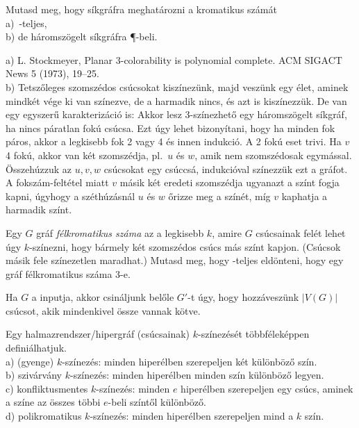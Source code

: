 \begin{Exercise}[counter={sorszam}, difficulty=0]
	Mutasd meg, hogy s\'ikgr\'afra  meghat\'arozni a kromatikus sz\'am\'at\\
	a)~\hard \NP-teljes,\\
	b) de h\'aromsz\"ogelt s\'ikgr\'afra \P-beli.
\end{Exercise}	
\begin{Answer}
	a)  L. Stockmeyer, Planar 3-colorability is polynomial complete. ACM SIGACT News 5 (1973),
	19--25.\\
	b) Tetsz\H oleges szomsz\'edos cs\'ucsokat kisz\'inez\"unk, majd vesz\"unk egy \'elet, aminek mindk\'et v\'ege ki van sz\'inezve, de a harmadik nincs, \'es azt is kisz\'inezz\"uk.
	De van egy egyszer\H u karakteriz\'aci\'o is: Akkor lesz 3-sz\'inezhet\H o egy h\'aromsz\"ogelt s\'ikgr\'af, ha nincs p\'aratlan fok\'u cs\'ucsa. Ezt \'ugy lehet bizony\'itani, hogy ha minden fok p\'aros, akkor a legkisebb fok 2 vagy 4 \'es innen indukci\'o. A 2 fok\'u eset trivi. Ha $v$ 4 fok\'u, akkor van k\'et szomsz\'edja, pl.\ $u$ \'es $w$, amik nem szomsz\'edosak egym\'assal. \"Osszeh\'uzzuk az $u,v,w$ cs\'ucsokat egy cs\'uccs\'a, indukci\'oval sz\'inezz\"uk ezt a gr\'afot. A foksz\'am-felt\'etel miatt $v$ m\'asik k\'et eredeti szomsz\'edja ugyanazt a sz\'int fogja kapni, \'ugyhogy a sz\'eth\'uz\'asn\'al $u$ \'es $w$ \H orizze meg a sz\'in\'et, m\'ig $v$ kaphatja a harmadik sz\'int.
\end{Answer}


\begin{Exercise}[counter={sorszam}, difficulty=0]
	Egy $G$ gr\'af \emph{f\'elkromatikus sz\'ama} az a legkisebb $k$, amire $G$ cs\'ucsainak fel\'et lehet \'ugy $k$-sz\'inezni, hogy b\'armely k\'et szomsz\'edos cs\'ucs m\'as sz\'int kapjon. (Cs\'ucsok m\'asik fele sz\'inezetlen maradhat.) Mutasd meg, hogy \NP-teljes eld\"onteni, hogy egy gr\'af f\'elkromatikus sz\'ama 3-e.
\end{Exercise}	
\begin{Answer}
	Ha $G$ a  inputja, akkor csin\'aljunk bel\H ole $G'$-t \'ugy, hogy hozz\'avesz\"unk $|V(G)|$ cs\'ucsot, akik mindenkivel \"ossze vannak k\"otve.
\end{Answer}

\bigskip
{} Egy halmazrendszer/hipergr\'af (cs\'ucsainak) $k$-sz\'inez\'es\'et t\"obbf\'elek\'eppen defini\'alhatjuk.\\
a) (gyenge) $k$-sz\'inez\'es: minden hiper\'elben szerepeljen k\'et k\"ul\"onb\"oz\H o sz\'in.\\
b) sziv\'arv\'any $k$-sz\'inez\'es: minden hiper\'elben minden sz\'in k\"ul\"onb\"oz\H o legyen.\\
c) konfliktusmentes $k$-sz\'inez\'es: minden $e$ hiper\'elben szerepeljen egy cs\'ucs, aminek a sz\'ine az \"osszes t\"obbi $e$-beli sz\'int\H ol k\"ul\"onb\"oz\H o.\\
d) polikromatikus $k$-sz\'inez\'es: minden hiper\'elben szerepeljen mind a $k$ sz\'in.

